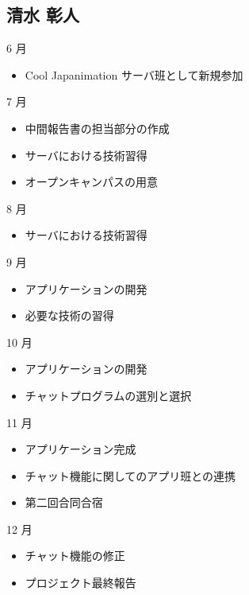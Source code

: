 \subsection{清水 彰人}
6 月
\begin{itemize}
\item Cool Japanimation サーバ班として新規参加
\end{itemize}
7 月
\begin{itemize}
\item 中間報告書の担当部分の作成
\item サーバにおける技術習得
\item オープンキャンパスの用意
\end{itemize}
8 月
\begin{itemize}
\item サーバにおける技術習得
\end{itemize}
9 月
\begin{itemize}
\item アプリケーションの開発
\item 必要な技術の習得
\end{itemize}
10 月
\begin{itemize}
\item アプリケーションの開発
\item チャットプログラムの選別と選択
\end{itemize}
11 月
\begin{itemize}
\item アプリケーション完成
\item チャット機能に関してのアプリ班との連携
\item 第二回合同合宿
\end{itemize}
12 月
\begin{itemize}
\item チャット機能の修正
\item プロジェクト最終報告
\end{itemize}


